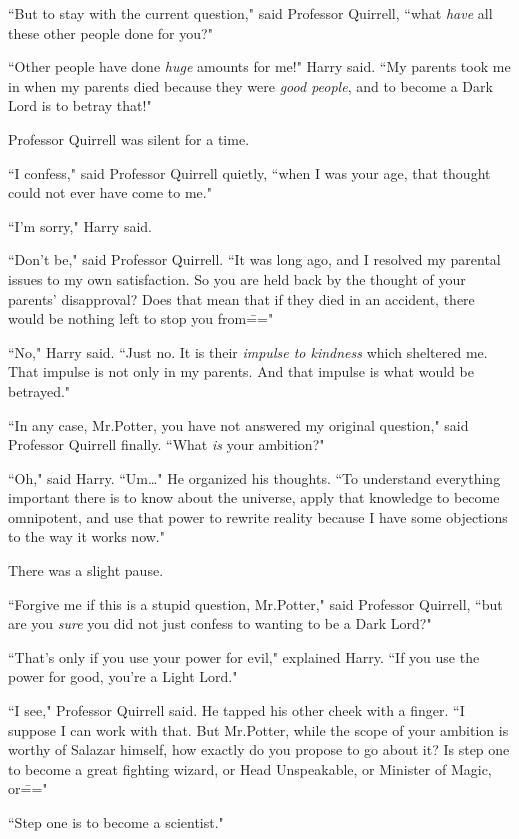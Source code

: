 ``But to stay with the current question," said Professor Quirrell, ``what \emph{have} all these other people done for you?"

``Other people have done \emph{huge} amounts for me!" Harry said. ``My parents took me in when my parents died because they were \emph{good people}, and to become a Dark Lord is to betray that!"

Professor Quirrell was silent for a time.

``I confess," said Professor Quirrell quietly, ``when I was your age, that thought could not ever have come to me."

``I'm sorry," Harry said.

``Don't be," said Professor Quirrell. ``It was long ago, and I resolved my parental issues to my own satisfaction. So you are held back by the thought of your parents' disapproval? Does that mean that if they died in an accident, there would be nothing left to stop you from\==="

``No," Harry said. ``Just no. It is their \emph{impulse to kindness} which sheltered me. That impulse is not only in my parents. And that impulse is what would be betrayed."

``In any case, Mr.\?Potter, you have not answered my original question," said Professor Quirrell finally. ``What \emph{is} your ambition?"

``Oh," said Harry. ``Um{\ldots}" He organized his thoughts. ``To understand everything important there is to know about the universe, apply that knowledge to become omnipotent, and use that power to rewrite reality because I have some objections to the way it works now."

There was a slight pause.

``Forgive me if this is a stupid question, Mr.\?Potter," said Professor Quirrell, ``but are you \emph{sure} you did not just confess to wanting to be a Dark Lord?"

``That's only if you use your power for evil," explained Harry. ``If you use the power for good, you're a Light Lord."

``I see," Professor Quirrell said. He tapped his other cheek with a finger. ``I suppose I can work with that. But Mr.\?Potter, while the scope of your ambition is worthy of Salazar himself, how exactly do you propose to go about it? Is step one to become a great fighting wizard, or Head Unspeakable, or Minister of Magic, or\==="

``Step one is to become a scientist."

